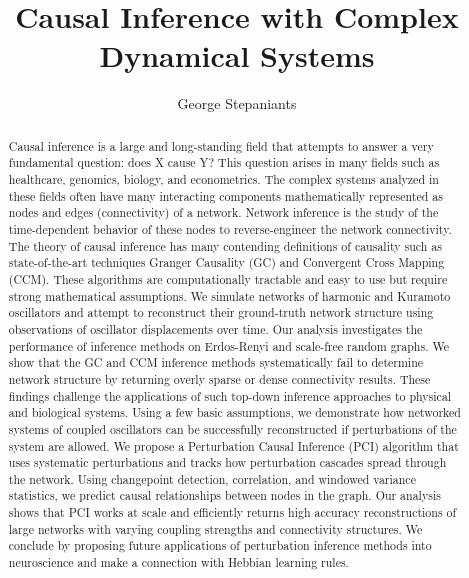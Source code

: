 \documentclass[]{article}
\title{Causal Inference with Complex Dynamical Systems}
\author{George Stepaniants}
\begin{document}
\maketitle
\begin{abstract}
Causal inference is a large and long-standing field that attempts to answer a very fundamental question: does X cause Y? This question arises in many fields such as healthcare, genomics, biology, and econometrics. The complex systems analyzed in these fields often have many interacting components mathematically represented as nodes and edges (connectivity) of a network. Network inference is the study of the time-dependent behavior of these nodes to reverse-engineer the network connectivity. The theory of causal inference has many contending definitions of causality such as state-of-the-art techniques Granger Causality (GC) and Convergent Cross Mapping (CCM). These algorithms are computationally tractable and easy to use but require strong mathematical assumptions. We simulate networks of harmonic and Kuramoto oscillators and attempt to reconstruct their ground-truth network structure using observations of oscillator displacements over time. Our analysis investigates the performance of inference methods on Erdos-Renyi and scale-free random graphs. We show that the GC and CCM inference methods systematically fail to determine network structure by returning overly sparse or dense connectivity results. These findings challenge the applications of such top-down inference approaches to physical and biological systems. Using a few basic assumptions, we demonstrate how networked systems of coupled oscillators can be successfully reconstructed if perturbations of the system are allowed. We propose a Perturbation Causal Inference (PCI) algorithm that uses systematic perturbations and tracks how perturbation cascades spread through the network. Using changepoint detection, correlation, and windowed variance statistics, we predict causal relationships between nodes in the graph. Our analysis shows that PCI works at scale and efficiently returns high accuracy reconstructions of large networks with varying coupling strengths and connectivity structures. We conclude by proposing future applications of perturbation inference methods into neuroscience and make a connection with Hebbian learning rules.
\end{abstract}
\end{document}
